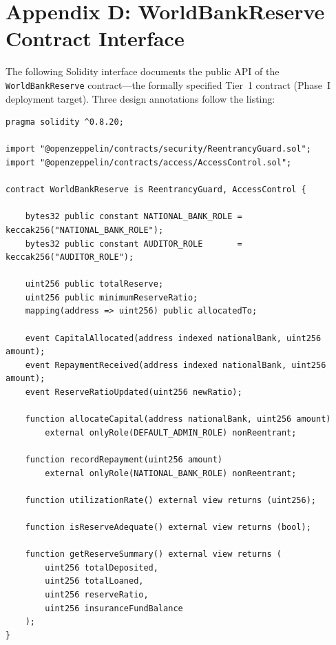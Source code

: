 \documentclass[12pt,a4paper]{report}
\begin{document}
\chapter*{Appendix D: WorldBankReserve Contract Interface}
{}

The following Solidity interface documents the public API of the \texttt{WorldBankReserve} contract---the formally specified Tier~1 contract (Phase~I deployment target). Three design annotations follow the listing:

\begin{lstlisting}[language=Solidity,basicstyle=\ttfamily\scriptsize,breaklines=true,
    commentstyle=\color{GrayText},keywordstyle=\color{PrimaryBlue}\bfseries,
    frame=single,rulecolor=\color{AccentBlue!40},captionpos=b,
    caption={WorldBankReserve.sol -- Tier 1 public interface. Full implementation in project repository.}]
pragma solidity ^0.8.20;

import "@openzeppelin/contracts/security/ReentrancyGuard.sol";
import "@openzeppelin/contracts/access/AccessControl.sol";

contract WorldBankReserve is ReentrancyGuard, AccessControl {

    bytes32 public constant NATIONAL_BANK_ROLE = keccak256("NATIONAL_BANK_ROLE");
    bytes32 public constant AUDITOR_ROLE       = keccak256("AUDITOR_ROLE");

    uint256 public totalReserve;
    uint256 public minimumReserveRatio;
    mapping(address => uint256) public allocatedTo;

    event CapitalAllocated(address indexed nationalBank, uint256 amount);
    event RepaymentReceived(address indexed nationalBank, uint256 amount);
    event ReserveRatioUpdated(uint256 newRatio);

    function allocateCapital(address nationalBank, uint256 amount)
        external onlyRole(DEFAULT_ADMIN_ROLE) nonReentrant;

    function recordRepayment(uint256 amount)
        external onlyRole(NATIONAL_BANK_ROLE) nonReentrant;

    function utilizationRate() external view returns (uint256);

    function isReserveAdequate() external view returns (bool);

    function getReserveSummary() external view returns (
        uint256 totalDeposited,
        uint256 totalLoaned,
        uint256 reserveRatio,
        uint256 insuranceFundBalance
    );
}
\end{lstlisting}
\end{document}
